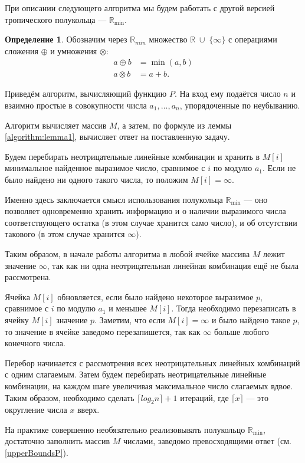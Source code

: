 \documentclass[12pt]{article}
\theoremstyle{definition}
\newtheorem{definition}[theorem]{Определение}
\begin{document}
При описании следующего алгоритма мы будем работать с другой версией тропического полукольца --- $\mathbb{R}_{\min}$.

\begin{definition}
Обозначим через $\mathbb{R}_{min}$ множество $\mathbb{R} \; \cup \; \{ \infty\}$ с операциями сложения $\oplus$ и умножения $\otimes$:
\begin{align*}
            a \oplus b &= \min(a, b)\\
            a \otimes b &= a + b.
        \end{align*}
\end{definition}

Приведём алгоритм, вычисляющий функцию $P$. На вход ему подаётся  число $n$ и взаимно простые в совокупности числа $a_1, \dots, a_n$, упорядоченные по неубыванию.

Алгоритм вычисляет массив $M$, а затем, по формуле из леммы \ref{algorithm:lemma1}, вычисляет ответ на поставленную задачу. 

Будем перебирать неотрицательные линейные комбинации и хранить в $M[i]$ минимальное найденное выразимое число, сравнимое с $i$ по модулю $a_1$. Если не было найдено ни одного такого числа, то положим $M[i] = \infty$.

Именно здесь заключается смысл использования полукольца $\mathbb{R}_{\min}$ --- оно позволяет одновременно хранить информацию и о наличии выразимого числа соответствующего остатка (в этом случае хранится само число), и об отсутствии такового (в этом случае хранится $\infty$).

Таким образом, в начале работы алгоритма в любой ячейке массива $M$ лежит значение $\infty$, так как ни одна неотрицательная линейная комбинация ещё не была рассмотрена.

Ячейка $M[i]$ обновляется, если было найдено некоторое выразимое $p$, сравнимое с $i$ по модулю $a_1$ и меньшее $M[i]$. Тогда необходимо перезаписать в ячейку $M[i]$ значение $p$. Заметим, что если $M[i] = \infty$ и было найдено такое $p$, то значение в ячейке заведомо перезапишется, так как $\infty$ больше любого конечного числа.

Перебор начинается с рассмотрения всех неотрицательных линейных комбинаций с одним слагаемым. Затем будем перебирать неотрицательные линейные комбинации, на каждом шаге увеличивая максимальное число слагаемых вдвое. Таким образом, необходимо сделать $\lceil log_2n \rceil + 1$ итераций, где $\lceil x \rceil$ --- это округление числа $x$ вверх.

На практике совершенно необязательно реализовывать полукольцо $\mathbb{R}_{\min}$, достаточно заполнить массив $M$ числами, заведомо превосходящими ответ (см. \ref{upperBoundsP}).
\end{document}
